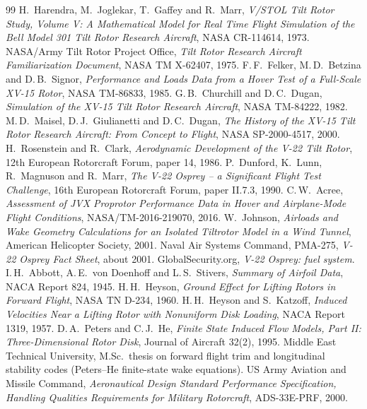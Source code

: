 \documentclass[10pt,a4paper,twocolumn]{article}
\begin{document}
\begin{thebibliography}{99}\small
{} H.\ Harendra, M.\ Joglekar, T.\ Gaffey and R.\ Marr, \emph{V/STOL Tilt Rotor Study, Volume V: A Mathematical Model for Real Time Flight Simulation of the Bell Model 301 Tilt Rotor Research Aircraft}, NASA CR-114614, 1973.
 NASA/Army Tilt Rotor Project Office, \emph{Tilt Rotor Research Aircraft Familiarization Document}, NASA TM X-62407, 1975.
 F.\,F.\ Felker, M.\,D.\ Betzina and D.\,B.\ Signor, \emph{Performance and Loads Data from a Hover Test of a Full-Scale XV-15 Rotor}, NASA TM-86833, 1985.
 G.\,B.\ Churchill and D.\,C.\ Dugan, \emph{Simulation of the XV-15 Tilt Rotor Research Aircraft}, NASA TM-84222, 1982.
 M.\,D.\ Maisel, D.\,J.\ Giulianetti and D.\,C.\ Dugan, \emph{The History of the XV-15 Tilt Rotor Research Aircraft: From Concept to Flight}, NASA SP-2000-4517, 2000.
 H.\ Rosenstein and R.\ Clark, \emph{Aerodynamic Development of the V-22 Tilt Rotor}, 12th European Rotorcraft Forum, paper 14, 1986.
 P.\ Dunford, K.\ Lunn, R.\ Magnuson and R.\ Marr, \emph{The V-22 Osprey -- a Significant Flight Test Challenge}, 16th European Rotorcraft Forum, paper II.7.3, 1990.
 C.\,W.\ Acree, \emph{Assessment of JVX Proprotor Performance Data in Hover and Airplane-Mode Flight Conditions}, NASA/TM-2016-219070, 2016.
 W.\ Johnson, \emph{Airloads and Wake Geometry Calculations for an Isolated Tiltrotor Model in a Wind Tunnel}, American Helicopter Society, 2001.
 Naval Air Systems Command, PMA-275, \emph{V-22 Osprey Fact Sheet}, about 2001.
 GlobalSecurity.org, \emph{V-22 Osprey: fuel system}.
 I.\,H.\ Abbott, A.\,E.\ von Doenhoff and L.\,S.\ Stivers, \emph{Summary of Airfoil Data}, NACA Report 824, 1945.
 H.\,H.\ Heyson, \emph{Ground Effect for Lifting Rotors in Forward Flight}, NASA TN D-234, 1960.
 H.\,H.\ Heyson and S.\ Katzoff, \emph{Induced Velocities Near a Lifting Rotor with Nonuniform Disk Loading}, NACA Report 1319, 1957.
 D.\,A.\ Peters and C.\,J.\ He, \emph{Finite State Induced Flow Models, Part II: Three-Dimensional Rotor Disk}, Journal of Aircraft 32(2), 1995.
 Middle East Technical University, M.Sc.\ thesis on forward flight trim and longitudinal stability codes (Peters--He finite-state wake equations).
 US Army Aviation and Missile Command, \emph{Aeronautical Design Standard Performance Specification, Handling Qualities
Requirements for Military Rotorcraft}, ADS-33E-PRF, 2000.

\end{thebibliography}
\end{document}
